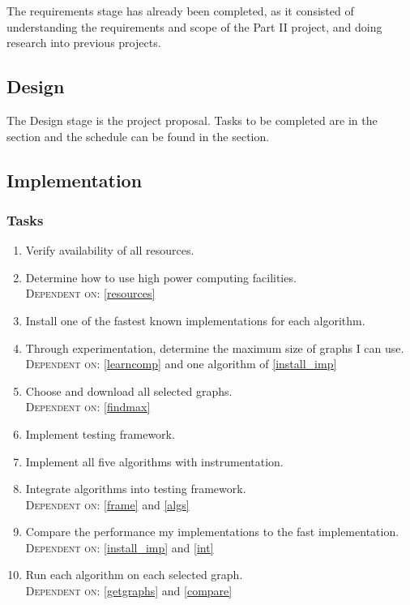 \documentclass[a4paper,12pt]{article}
\begin{document}
The requirements stage has already been completed, as it consisted of understanding the requirements and scope of the Part II project, and doing research into previous projects.
\subsection{Design} 

The Design stage is the project proposal. Tasks to be completed are in the  section and the schedule can be found in the  section.

\subsection{Implementation} \label{implementation}

\subsubsection*{Tasks}
\begin{enumerate}[label={\arabic*.}]
\item Verify availability of all resources.\label{resources}

\item Determine how to use high power computing facilities.\label{learncomp}\\
\textsc{Dependent on:} \ref{resources}

\item Install one of the fastest known implementations for each algorithm. \label{install_imp}

\item Through experimentation, determine the maximum size of graphs I can use.\\
 \textsc{Dependent on:} \ref{learncomp} and one algorithm of \ref{install_imp}  \label{findmax}
 
 \item Choose and download all selected graphs.\\ 
 \textsc{Dependent on:} \ref{findmax} \label{getgraphs}
 
\item Implement testing framework. \label{frame}

\item Implement all five algorithms with instrumentation.\label{algs}

\item Integrate algorithms into testing framework. \label{int}\\
\textsc{Dependent on:} \ref{frame} and \ref{algs}

\item Compare the performance my implementations to the fast implementation.\\
\textsc{Dependent on:} \ref{install_imp} and \ref{int} \label{compare}

\item Run each algorithm on each selected graph.\\
\textsc{Dependent on:} \ref{getgraphs} and \ref{compare} \label{run}
\end{enumerate}
\end{document}
